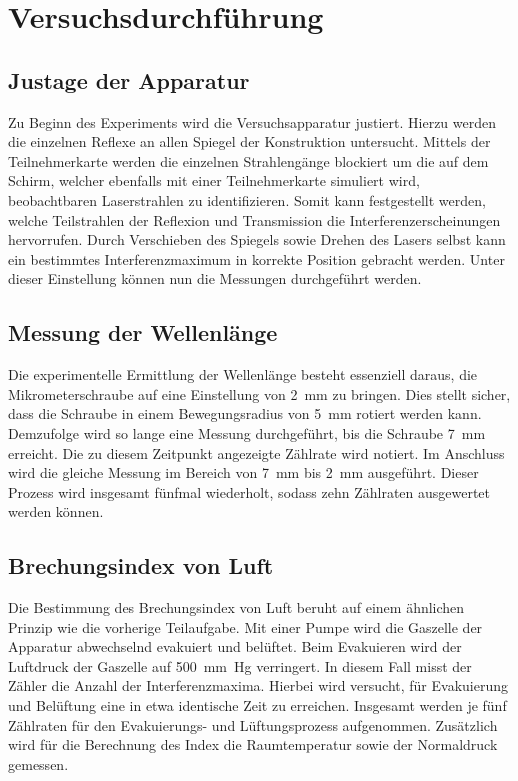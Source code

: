 \section{Versuchsdurchführung}
\label{sec:Versuchsdurchfuehrung}

\subsection{Justage der Apparatur}

Zu Beginn des Experiments wird die Versuchsapparatur justiert. Hierzu werden die einzelnen Reflexe an allen Spiegel der Konstruktion 
untersucht. Mittels der Teilnehmerkarte werden die einzelnen Strahlengänge blockiert um die auf dem Schirm, welcher ebenfalls mit einer 
Teilnehmerkarte simuliert wird, beobachtbaren Laserstrahlen zu identifizieren. Somit kann festgestellt werden, welche Teilstrahlen der 
Reflexion und Transmission die Interferenzerscheinungen hervorrufen. Durch Verschieben des Spiegels  sowie Drehen des Lasers
selbst kann ein bestimmtes Interferenzmaximum in korrekte Position gebracht werden. Unter dieser Einstellung können nun die Messungen 
durchgeführt werden.

\subsection{Messung der Wellenlänge}

Die experimentelle Ermittlung der Wellenlänge besteht essenziell daraus, die Mikrometerschraube auf eine Einstellung von \qty{2}{\milli\meter}
zu bringen. Dies stellt sicher, dass die Schraube in einem Bewegungsradius von \qty{5}{\milli\meter} rotiert werden kann. Demzufolge wird so 
lange eine Messung durchgeführt, bis die Schraube \qty{7}{\milli\meter} erreicht. Die zu diesem Zeitpunkt angezeigte Zählrate wird notiert.
Im Anschluss wird die gleiche Messung im Bereich von \qty{7}{\milli\meter} bis \qty{2}{\milli\meter} ausgeführt. Dieser Prozess wird insgesamt 
fünfmal wiederholt, sodass zehn Zählraten ausgewertet werden können.

\subsection{Brechungsindex von Luft}

Die Bestimmung des Brechungsindex von Luft beruht auf einem ähnlichen Prinzip wie die vorherige Teilaufgabe. Mit einer Pumpe wird die Gaszelle 
der Apparatur abwechselnd evakuiert und belüftet. Beim Evakuieren wird der Luftdruck der Gaszelle auf \qty{500}{\milli \meter Hg} verringert.
In diesem Fall misst der Zähler die Anzahl der Interferenzmaxima. Hierbei wird versucht, 
für Evakuierung und Belüftung eine in etwa identische Zeit zu erreichen. Insgesamt werden je fünf Zählraten für den Evakuierungs- und 
Lüftungsprozess aufgenommen. Zusätzlich wird für die Berechnung des Index die Raumtemperatur sowie der Normaldruck gemessen. 

